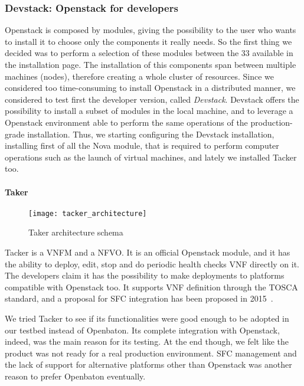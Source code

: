 \subsubsection{Devstack: Openstack for developers}
Openstack is composed by modules, giving the possibility to the user who wants 
to install it to choose only the components it really needs. So the first thing 
we decided was to perform a selection of these modules between the 33 available 
in the installation page. The installation of this components span between 
multiple machines (nodes), therefore creating a whole cluster of resources. 
Since we considered too time-consuming to install Openstack in a distributed 
manner, we considered to test first the developer version, called 
\emph{Devstack}. Devstack offers the possibility to install a subset of modules 
in the local machine, and to leverage a Openstack environment able to perform 
the same operations of the production-grade installation. Thus, we starting 
configuring the Devstack installation, installing first of all the Nova 
module, that is required to perform computer operations such as the launch of 
virtual machines, and lately we installed Tacker too.

\paragraph*{Taker}
\begin{figure}[t]
  \centering
  \texttt{[image: tacker\_architecture]}
  \caption[Taker architecture schema]{Taker architecture
    schema~\cite{tackerOpenstackwiki}}
\end{figure}
Tacker is a VNFM and a NFVO. It is an official Openstack module, and it has the
ability to deploy, edit, stop and do periodic health checks VNF directly on it.
The developers claim it has the possibility to make deployments to platforms
compatible with Openstack too. It supports VNF definition through the TOSCA
standard, and a proposal for SFC integration has been proposed in
2015~\cite{tackerOpenstackwiki}.

We tried Tacker to see if its functionalities were good enough to be adopted in
our testbed instead of Openbaton. Its complete integration with Openstack,
indeed, was the main reason for its testing. At the end though, we felt like the
product was not ready for a real production environment. SFC management and the
lack of support for alternative platforms other than Openstack was another
reason to prefer Openbaton eventually.

